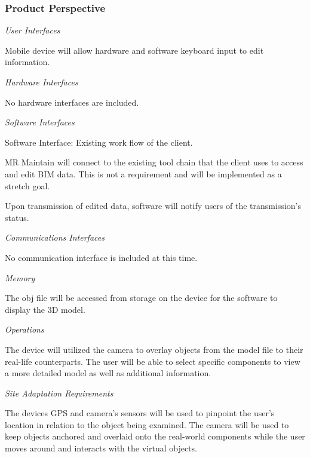 \documentclass[onecolumn, draftclsnofoot,10pt, compsoc]{IEEEtran}
\begin{document}
            \subsubsection{Product Perspective}
            \textit{User Interfaces}\par
            \hangindent=10mm\noindent Mobile device will allow hardware and software keyboard input to edit information.\par
            \textit{Hardware Interfaces}\par
            \hangindent=10mm\noindent No hardware interfaces are included.\par
            \textit{Software Interfaces}\par
            \noindent\hspace{10mm}Software Interface: Existing work flow of the client.\par
            \hangindent=15mm\noindent MR Maintain will connect to the existing tool chain that the client uses to access and edit BIM data. This is not a requirement and will be implemented as a stretch goal.\par
            \noindent{}\hspace{15mm}Upon transmission of edited data, software will notify users of the transmission's status.\par
            \textit{Communications Interfaces}\par
            \hangindent=10mm\noindent No communication interface is included at this time.\par
            \textit{Memory}\par
            \hangindent=10mm\noindent The obj file will be accessed from storage on the device for the software to display the 3D model. \par
            \textit{Operations}\par
            \hangindent=10mm\noindent The device will utilized the camera to overlay objects from the model file to their real-life counterparts. The user will be able to select specific components to view a more detailed model as well as additional information. \par
            \textit{Site Adaptation Requirements}\par
            \hangindent=10mm\noindent The devices GPS and camera's sensors will be used to pinpoint the user's location in relation to the object being examined. The camera will be used to keep objects anchored and overlaid onto the real-world components while the user moves around and interacts with the virtual objects. \par
\end{document}
